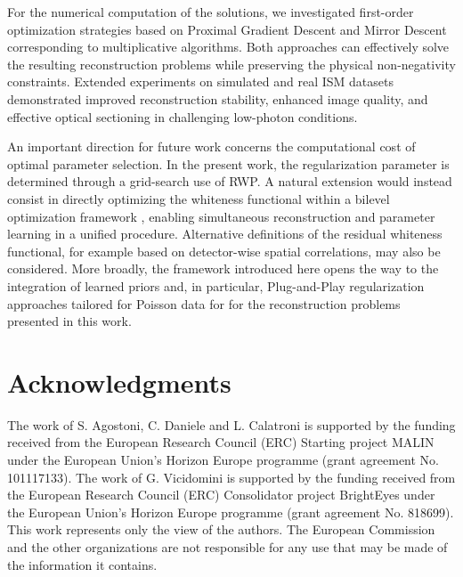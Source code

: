 \documentclass[letterpaper]{article}
\begin{document}
For the numerical computation of the solutions, we investigated first-order optimization strategies based on Proximal Gradient Descent and Mirror Descent corresponding to multiplicative algorithms. Both approaches can effectively solve the resulting reconstruction problems while preserving the physical non-negativity constraints. Extended experiments on simulated and real ISM datasets demonstrated improved reconstruction stability, enhanced image quality, and effective optical sectioning in challenging low-photon conditions.



An important direction for future work concerns the computational cost of optimal parameter selection. In the present work, the regularization parameter is determined through a grid-search use of RWP. A natural extension would instead consist in directly optimizing the whiteness functional within a bilevel optimization framework \cite{SantambrogioWP,PragliolaBilevelWP}, enabling simultaneous reconstruction and parameter learning in a unified procedure. Alternative definitions of the residual whiteness functional, for example based on detector-wise spatial correlations, may also be considered. More broadly, the framework introduced here opens the way to the integration of learned priors and, in particular, Plug-and-Play regularization approaches \cite{Kamilov_Pnp} tailored for Poisson data \cite{hurault2023convergent,Daniele2026,Benfenati2025} for for the reconstruction problems presented in this work.


\section*{Acknowledgments}

The work of S. Agostoni, C. Daniele and L. Calatroni is supported by the
funding received from the European Research Council (ERC) Starting project MALIN under
the European Union’s Horizon Europe programme (grant agreement No. 101117133).
The work of G. Vicidomini is supported by the
funding received from the European Research Council (ERC) Consolidator project BrightEyes under
the European Union’s Horizon Europe programme (grant agreement No. 818699).
This work represents only the view of the authors. The European Commission and the other
organizations are not responsible for any use that may be made of the information it contains.
\end{document}

